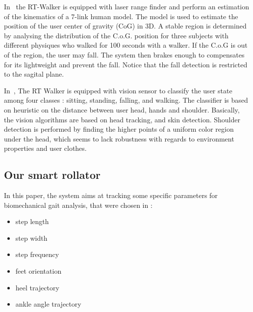 \documentclass[letterpaper, 10 pt, conference]{ieeeconf}
\begin{document}
In~\cite{Hirata2008a} the RT-Walker is equipped with laser range finder and perform an estimation of the kinematics of a 7-link human model. The model is used to estimate the position of the user center of gravity (CoG) in 3D. A stable region is determined by analysing the distribution of the C.o.G. position for three subjects with different physiques who walked for 100 seconds with a walker. If the C.o.G is out of the region, the user may fall. The system then brakes enough to compensates for its lightweight and prevent the fall. Notice that the fall detection is restricted to the sagital plane.

In~\cite{Taghvaei10}, The RT Walker is equipped with vision sensor to classify the user state among four classes : sitting, standing, falling, and walking. The classifier is based on heuristic on the distance between user head, hands and shoulder. Basically, the vision algorithms are based on head tracking, and skin detection. Shoulder detection is performed by finding the higher points of a uniform color region under the head, which seems to lack robustness with regards to environment properties and user clothes.   


\subsection{Our smart rollator}

In this paper, the system aims at tracking some specific parameters for biomechanical gait analysis, that were chosen in \cite{Dune12}: 
\begin{itemize}
\item step length
\item step width
\item step frequency
\item feet orientation
\item heel trajectory
\item ankle angle trajectory
\end{itemize}
\end{document}
